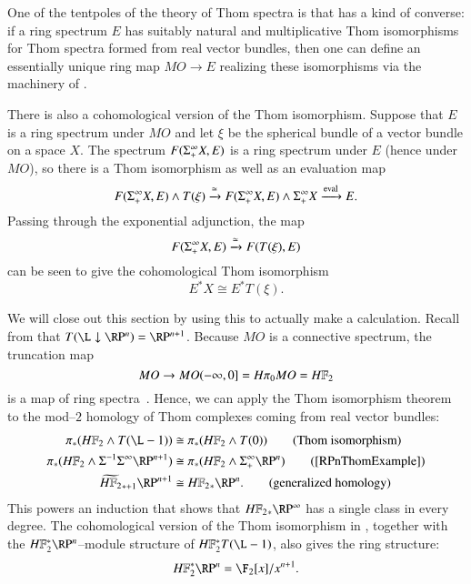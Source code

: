 \begin{remark}
One of the tentpoles of the theory of Thom spectra is that  has a kind of converse: if a ring spectrum $E$ has suitably natural and multiplicative Thom isomorphisms for Thom spectra formed from real vector bundles, then one can define an essentially unique ring map $MO \to E$ realizing these isomorphisms via the machinery of .
\end{remark}

\begin{remark}\label{CohomologicalThomIso}
There is also a cohomological version of the Thom isomorphism.  Suppose that $E$ is a ring spectrum under $MO$ and let $\xi$ be the spherical bundle of a vector bundle on a space $X$.  The spectrum $F(\Sigma^\infty_+ X, E)$ is a ring spectrum under $E$ (hence under $MO$), so there is a Thom isomorphism as well as an evaluation map \[F(\Sigma^\infty_+ X, E) \wedge T(\xi) \xrightarrow{\simeq} F(\Sigma^\infty_+ X, E) \wedge \Sigma^\infty_+ X \xrightarrow{\operatorname{eval}} E.\]  Passing through the exponential adjunction, the map \[F(\Sigma^\infty_+ X, E) \xrightarrow{\simeq} F(T(\xi), E)\] can be seen to give the cohomological Thom isomorphism \[E^* X \cong E^* T(\xi).\]
\end{remark}

\begin{example}\label{HF2RPinftyExample}
We will close out this section by using this to actually make a calculation. Recall from  that $T(\L \downarrow \RP^n) = \RP^{n+1}$.  Because $MO$ is a connective spectrum, the truncation map \[MO \to MO(-\infty, 0] = H\pi_0 MO = \HFtwo\] is a map of ring spectra~\cite[Lemma II.2.12]{MayRingSpacesSpectra}.  Hence, we can apply the Thom isomorphism theorem to the mod--$2$ homology of Thom complexes coming from real vector bundles:
\begin{align*}
\pi_* (\HFtwo \sm T(\L - 1)) & \cong \pi_* (\HFtwo \sm T(0)) \tag{Thom isomorphism} \\
\pi_* (\HFtwo \sm \Susp^{-1} \Susp^\infty \RP^{n+1}) & \cong \pi_* (\HFtwo \sm \Susp^\infty_+ \RP^n) \tag{\Cref{RPnThomExample}} \\
\widetilde{\HFtwo}_{*+1} \RP^{n+1} & \cong \HFtwo_* \RP^n. \tag{generalized homology}
\end{align*}
This powers an induction that shows that $\HFtwo_* \RP^\infty$ has a single class in every degree.  The cohomological version of the Thom isomorphism in , together with the $\HFtwo^* \RP^n$--module structure of $\HFtwo^* T(\L-1)$, also gives the ring structure: \[\HFtwo^* \RP^n = \F_2[x] / x^{n+1}.\]
\end{example}






